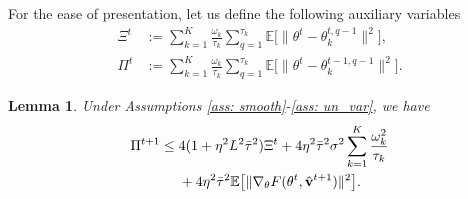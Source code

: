 \documentclass[twoside,journal]{IEEEtran}
\def\VectorFont{\bf}
\newcommand{\vv}{{\VectorFont v}}
\newtheorem{lemma}{Lemma}
\begin{document}
 For the ease of presentation, let us define the following auxiliary variables
\begin{align*}
\Xi^t&:=\sum_{k=1}^K\frac{\omega_k}{\tau_k}\sum_{q=1}^{\tau_k}
\mathbb{E}\big[\|\theta^t-\theta_k^{t,q-1}\|^2\big],\\
\Pi^t&:=\sum_{k=1}^K\frac{\omega_k}{\tau_k}\sum_{q=1}^{\tau_k}
\mathbb{E}\big[\|\theta^t-\theta_k^{t-1,q-1}\|^2\big].
\end{align*}
\begin{lemma}\label{lem: Pi}
Under Assumptions \ref{ass: smooth}-\ref{ass: un_var}, we have
\begin{align}
\nonumber\Pi^{t+1}&\leq 4(1+\eta^2L^2\bar{\tau}^2)\Xi^t +4\eta^2\bar{\tau}^2\sigma^2\sum_{k=1}^K\frac{\omega_k^2}{\tau_k}\\
&~~~~+4\eta^2\bar{\tau}^2
\mathbb{E}\big[\|\nabla_{\theta} F(\theta^{t},\hat{\vv}^{t+1})\|^2\big].
\end{align}
\end{lemma}
\end{document}
